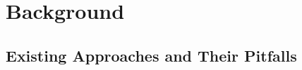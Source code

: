 \chapter{Background}
\label{cha:background}

\section{Existing Approaches and Their Pitfalls}
\label{sec:exist-appr-their}



